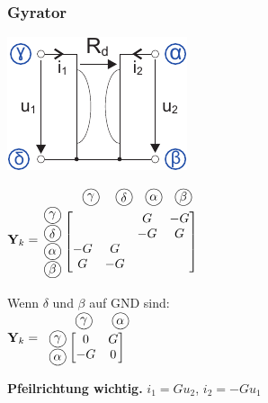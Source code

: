 \documentclass[a4paper,twocolumn,10pt]{article}
\newcommand*\kreis[1]{\unitlength1ex\begin{picture}(2.5,2.5)%
\put(0.75,0.75){\circle{3}}\put(0.7,0.7){\makebox(0,0){#1}}\end{picture}}
\begin{document}
\subsubsection*{Gyrator}
\begin{minipage}[b]{0.18\textwidth}
\includegraphics[width=\textwidth]{Grafiken/KSA_Gyrator}
\end{minipage}
\hfill
\begin{minipage}[b]{0.30\textwidth}
$\textbf{Y}_k=\;\;\begin{matrix}\begin{matrix} \;\;\; & \;\;\;\kreis{$\gamma$} & \;\;\kreis{$\delta$} & \;\kreis{$\alpha$} & \;\kreis{$\beta$} \end{matrix}\\\begin{matrix} \kreis{$\gamma$} \\ \kreis{$\delta$} \\ \kreis{$\alpha$} \\ \kreis{$\beta$} \end{matrix} \left[\begin{matrix}  &  & G & -G \\  &  & -G & G \\ -G & G & & \\ G & -G & & \end{matrix}\right]\\ \; \end{matrix}$\\
Wenn $\delta$ und $\beta$ auf GND sind:\\
$\textbf{Y}_k=\begin{matrix}\begin{matrix}\;\;\;\;\;\;\;\;\;\;\;\kreis{$\gamma$}&\;\;\;\kreis{$\alpha$} \end{matrix}\\\;\;\begin{matrix} \kreis{$\gamma$} \\ \kreis{$\alpha$} \end{matrix} \left[\begin{matrix} 0 & G \\-G & 0 \end{matrix}\right]
\end{matrix}$
\end{minipage}
\textbf{Pfeilrichtung wichtig.} 
$i_1=Gu_2$, $i_2=-Gu_1$
\end{document}
